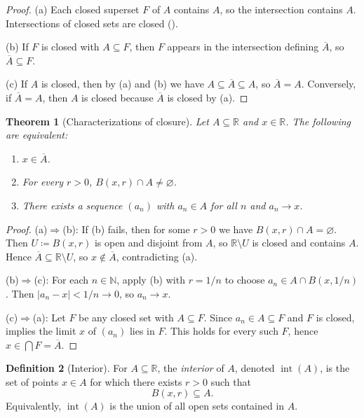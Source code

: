 \documentclass[12pt]{article}
\numberwithin{equation}{section}
\def\abs#1{|#1|}
\newcommand{\RR}{\mathbb{R}}
\newcommand{\NN}{\mathbb{N}}
\let\emptyset\varnothing
\DeclarePairedDelimiter{\abs}{\lvert}{\rvert}
\DeclareMathOperator{\Int}{int}
\theoremstyle{plain}
\newtheorem{theorem}{Theorem}[section]
\theoremstyle{definition}
\newtheorem{definition}[theorem]{Definition}
\theoremstyle{remark}
\begin{document}
\begin{proof}
(a) Each closed superset $F$ of $A$ contains $A$, so the intersection contains $A$. Intersections of closed sets are closed ().

(b) If $F$ is closed with $A\subseteq F$, then $F$ appears in the intersection defining $\overline{A}$, so $\overline{A}\subseteq F$.

(c) If $A$ is closed, then by (a) and (b) we have $A\subseteq \overline{A}\subseteq A$, so $\overline{A}=A$.
Conversely, if $\overline{A}=A$, then $A$ is closed because $\overline{A}$ is closed by (a).
\end{proof}

\begin{theorem}[Characterizations of closure]\label{thm:closure-char}
Let $A\subseteq\RR$ and $x\in\RR$. The following are equivalent:
\begin{enumerate}[label=(\alph*)]
\item $x\in \overline{A}$.
\item For every $r>0$, $B(x,r)\cap A\neq \emptyset$.
\item There exists a sequence $(a_n)$ with $a_n\in A$ for all $n$ and $a_n\to x$.
\end{enumerate}
\end{theorem}

\begin{proof}
(a)$\Rightarrow$(b): If (b) fails, then for some $r>0$ we have $B(x,r)\cap A=\emptyset$.
Then $U\coloneqq B(x,r)$ is open and disjoint from $A$, so $\RR\setminus U$ is closed and contains $A$.
Hence $\overline{A}\subseteq \RR\setminus U$, so $x\notin \overline{A}$, contradicting (a).

(b)$\Rightarrow$(c): For each $n\in\NN$, apply (b) with $r=1/n$ to choose $a_n\in A\cap B(x,1/n)$.
Then $\abs{a_n-x}<1/n\to 0$, so $a_n\to x$.

(c)$\Rightarrow$(a): Let $F$ be any closed set with $A\subseteq F$.
Since $a_n\in A\subseteq F$ and $F$ is closed,  implies the limit $x$ of $(a_n)$ lies in $F$.
This holds for every such $F$, hence $x\in\bigcap F=\overline{A}$.
\end{proof}

\begin{definition}[Interior]\label{def:interior}
For $A\subseteq\RR$, the \emph{interior} of $A$, denoted $\Int(A)$, is the set of points $x\in A$ for which there exists $r>0$ such that
\[
B(x,r)\subseteq A.
\]
Equivalently, $\Int(A)$ is the union of all open sets contained in $A$.
\end{definition}
\end{document}
